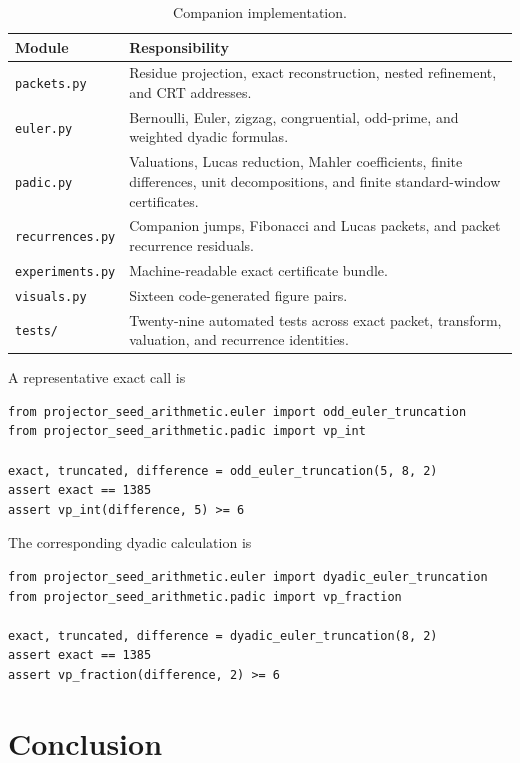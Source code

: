 \documentclass[11pt]{article}
\theoremstyle{definition}
\theoremstyle{remark}
\begin{document}
\begin{table}[htbp]
\centering
\caption{Companion implementation.}
\label{tab:implementation}
\begin{tabularx}{0.95\textwidth}{L{0.29\textwidth}Y}
\toprule
Module & Responsibility\\
\midrule
\texttt{packets.py} & Residue projection, exact reconstruction, nested refinement, and CRT addresses.\\
\texttt{euler.py} & Bernoulli, Euler, zigzag, congruential, odd-prime, and weighted dyadic formulas.\\
\texttt{padic.py} & Valuations, Lucas reduction, Mahler coefficients, finite differences, unit decompositions, and finite standard-window certificates.\\
\texttt{recurrences.py} & Companion jumps, Fibonacci and Lucas packets, and packet recurrence residuals.\\
\texttt{experiments.py} & Machine-readable exact certificate bundle.\\
\texttt{visuals.py} & Sixteen code-generated figure pairs.\\
\texttt{tests/} & Twenty-nine automated tests across exact packet, transform, valuation, and recurrence identities.\\
\bottomrule
\end{tabularx}
\end{table}

A representative exact call is
\begin{lstlisting}
from projector_seed_arithmetic.euler import odd_euler_truncation
from projector_seed_arithmetic.padic import vp_int

exact, truncated, difference = odd_euler_truncation(5, 8, 2)
assert exact == 1385
assert vp_int(difference, 5) >= 6
\end{lstlisting}

The corresponding dyadic calculation is
\begin{lstlisting}
from projector_seed_arithmetic.euler import dyadic_euler_truncation
from projector_seed_arithmetic.padic import vp_fraction

exact, truncated, difference = dyadic_euler_truncation(8, 2)
assert exact == 1385
assert vp_fraction(difference, 2) >= 6
\end{lstlisting}

\section{Conclusion}
\end{document}
